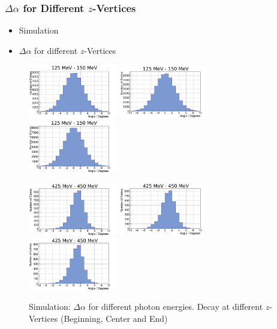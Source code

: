 \documentclass[slidestop,compress,mathserif]{beamer}
\begin{document}
\begin{frame}
	\frametitle{$\Delta \alpha$ for Different $z$-Vertices}
	\begin{itemize}
		\item Simulation
		\item $\Delta \alpha$ for different $z$-Vertices
	\end{itemize}

\begin{figure}
	\includegraphics[width=0.35\textwidth]{Pictures/20170205DiffOeffZVertex-4_125MeV}
	\includegraphics[width=0.35\textwidth]{Pictures/20170205DiffOeffZVertexUrsprung135MeV}	
	\includegraphics[width=0.35\textwidth]{Pictures/20170205DiffOeffZVertex+4_125MeV}	

	\includegraphics[width=0.35\textwidth]{Pictures/20170205DiffOeffZVertex-4_425MeV}
	\includegraphics[width=0.35\textwidth]{Pictures/20170205DiffOeffZVertexUrsprung425MeV}
	\includegraphics[width=0.35\textwidth]{Pictures/20170205DiffOeffZVertex+4_425MeV}	
	\caption{Simulation: $\Delta \alpha$ for different photon energies. Decay at different $z$-Vertices (Beginning, Center and End)}
\end{figure}
	
\end{frame}
\end{document}
